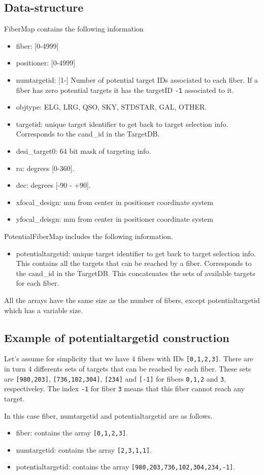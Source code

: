 \documentclass{article}
\begin{document}
\subsection{Data-structure}

FiberMap contains the following information
\begin{itemize}
\item fiber: [0-4999]
\item positioner: [0-4999]
\item numtargetid: [1-] Number of potential target IDs associated to each
  fiber. If a fiber has zero potential targets it has the
  targetID \texttt{-1} associated to it. 
\item objtype: ELG, LRG, QSO, SKY, STDSTAR, GAL, OTHER. 
\item targetid: 
  unique target identifier to get back to target
  selection info. Corresponds to the cand\_id in the TargetDB.
\item desi\_target0: 64 bit mask of targeting info. 
\item ra: degrees [0-360]. 
\item dec: degrees [-90 - +90]. 
\item xfocal\_design: mm from center in positioner coordinate system 
\item yfocal\_deisgn: mm from center in positioner coordinate system  
\end{itemize}

\noindent
PotentialFiberMap includes the following information.
\begin{itemize}
\item potentialtargetid:  unique target identifier to get back to target
  selection info. This contains  all the targets that can be
  reached by a fiber. Corresponds to the cand\_id in the TargetDB. 
  This concatenates the sets of available
  targets for each fiber.
\end{itemize}
All the arrays have the same size as the number of fibers, except
potentialtargetid which has a variable size.



\subsection{Example of potentialtargetid construction}
Let's assume for simplicity that we have 4 fibers with IDs
\texttt{[0,1,2,3]}. There are in turn 4 differents sets of targets that
can be reached by each fiber. These sets are \texttt{[980,203]},
\texttt{[736,102,304]}, \texttt{[234]} and \texttt{[-1]} for fibers
\texttt{0,1,2} and \texttt{3}, respectiveley.
The index \texttt{-1} for fiber \texttt{3} means that this fiber
cannot reach any target.

In this case fiber, numtargetid and potentialtargetid are as follows.
\begin{itemize}
\item
fiber: contains the array \texttt{[0,1,2,3]}.
\item
numtargetid: contains the array \texttt{[2,3,1,1]}.
\item
potentialtargetid: contains the array \texttt{[980,203,736,102,304,234,-1]}.

\end{itemize}
\end{document}
